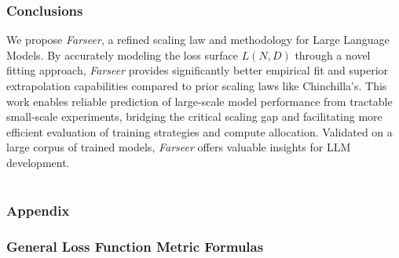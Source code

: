 \documentclass{article}
\begin{document}
\section{Conclusions}

We propose \textit{Farseer}, a refined scaling law and methodology for Large Language Models. By accurately modeling the loss surface $L(N,D)$ through a novel fitting approach, \textit{Farseer} provides significantly better empirical fit and superior extrapolation capabilities compared to prior scaling laws like Chinchilla's. This work enables reliable prediction of large-scale model performance from tractable small-scale experiments, bridging the critical scaling gap and facilitating more efficient evaluation of training strategies and compute allocation. Validated on a large corpus of trained models, \textit{Farseer} offers valuable insights for LLM development.







\newpage
\appendix


\part{}
\section*{\centering \LARGE{Appendix}}
\parttoc


\clearpage
\section{General Loss Function Metric Formulas}
\label{app:loss_formulas}
\end{document}
